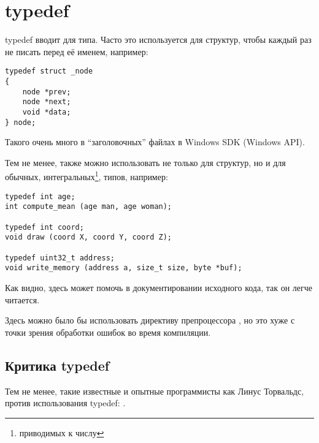 ﻿\section{typedef}

typedef вводит  для типа. Часто это используется для структур, чтобы каждый раз не писать 
перед её именем, например:

\begin{lstlisting}
typedef struct _node
{
	node *prev;
	node *next;
	void *data;
} node;
\end{lstlisting}

Такого очень много в ``заголовочных'' файлах в Windows SDK (Windows API).

Тем не менее,  также можно использовать не только для структур, но и для обычных, 
интегральных\footnote{приводимых к числу}, типов, например:

\begin{lstlisting}
typedef int age;
int compute_mean (age man, age woman);

typedef int coord;
void draw (coord X, coord Y, coord Z);

typedef uint32_t address;
void write_memory (address a, size_t size, byte *buf);
\end{lstlisting}

Как видно,  здесь может помочь в документировании исходного кода, так он легче читается.

Здесь можно было бы использовать директиву препроцессора , но это хуже с точки зрения обработки ошибок во время компиляции.

\subsection{Критика typedef}

Тем не менее, такие известные и опытные программисты как Линус Торвальдс, против использования typedef:
\cite{Torvalds:2002}.

